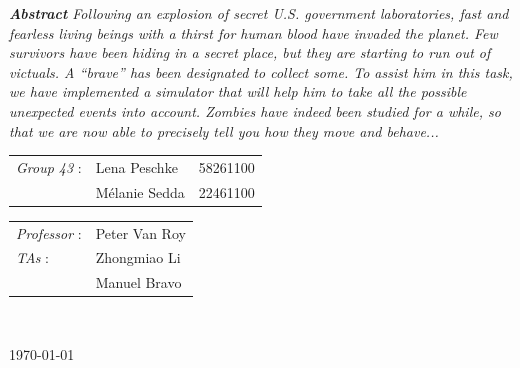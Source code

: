 \documentclass[11pt,a4paper]{article}
\begin{document}
\begin{titlepage}
\emph{\textbf{Abstract} Following an explosion of secret U.S. government laboratories, fast and fearless living beings with a thirst for human blood have invaded the planet. Few survivors have been hiding in a secret place, but they are starting to run out of victuals. A ``brave'' has been designated to collect some. To assist him in this task, we have implemented a simulator that will help him to take all the possible unexpected events into account. Zombies have indeed been studied for a while, so that we are now able to precisely tell you how they move and behave...}\\[0.9cm]


\begin{multicols}{2}
\large
\begin{centering}
\end{centering}
{\begin{tabular}{lll}
\textit{Group 43}  : & Lena Peschke & 58261100\\
        		     & Mélanie Sedda & 22461100 \\
\end{tabular}}

\normalsize
{\begin{tabular}{ll}
\textit{Professor}  : & Peter Van Roy \\
\textit{TAs} 		: & Zhongmiao Li \\
					  & Manuel Bravo \\
\end{tabular}}
\\[1cm]
\end{multicols}

{\normalsize \today}\\[0.6cm] %





\newpage

\end{titlepage}



\end{document}
